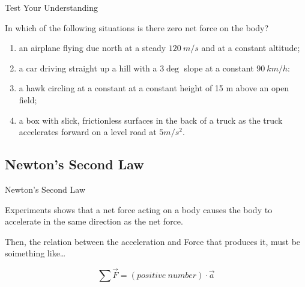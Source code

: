 \documentclass[]{beamer}
\begin{document}


\begin{frame}

  Test Your Understanding 
  \vspace{3mm}
  
  In which of the following  situations is there zero net force on the body? 
  
  \begin{enumerate}
    \item an airplane flying due north at a steady $120~m/s$ and at a constant altitude;
    \item a car driving straight up a hill with a $3\deg$ slope at a constant $90~km/h$:
    \item a hawk circling at a constant at a constant height of 15 m above an open field;
    \item  a box with slick, frictionless surfaces in the back of a truck as the truck 
    accelerates forward on a level road at $5 m/s^ 2$.
  \end{enumerate}
  
  
 
     \end{frame}


\subsection{  Newton's Second Law }
\begin{frame}

 Newton's Second Law 
  \vspace{3mm}
  
  Experiments shows that a net force acting on a body causes the body to accelerate in
  the same direction as the net force.
  \vspace{3mm}
 
\pause
\vspace{5mm}


Then, the relation between the acceleration and Force that produces it, must be soimething like\dots

\begin{equation}
  \sum\vec{F}=(positive~number)\cdot \vec{a}
\end{equation}


     \end{frame}
\end{document}
